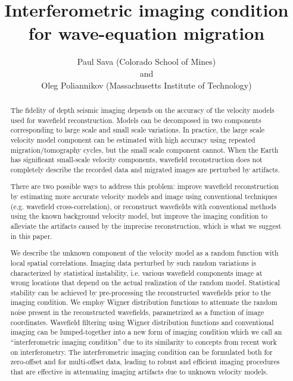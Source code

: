 


\title{Interferometric imaging condition for wave-equation migration}
\author{
Paul Sava (Colorado School of Mines) 
\\ and \\
Oleg Poliannikov (Massachusetts Institute of Technology)
}

\maketitle

\begin{abstract}
The fidelity of depth seismic imaging depends on the accuracy of the
velocity models used for wavefield reconstruction. Models can be
decomposed in two components corresponding to large scale and small
scale variations. In practice, the large scale velocity model
component can be estimated with high accuracy using repeated
migration/tomography cycles, but the small scale component
cannot. When the Earth has significant small-scale velocity
components, wavefield reconstruction does not completely describe the
recorded data and migrated images are perturbed by artifacts.

There are two possible ways to address this problem: improve wavefield
reconstruction by estimating more accurate velocity models and image
using conventional techniques (e.g. wavefield cross-correlation), or
reconstruct wavefields with conventional methods using the known
background velocity model, but improve the imaging condition to
alleviate the artifacts caused by the imprecise reconstruction, which
is what we suggest in this paper.

We describe the unknown component of the velocity model as a random
function with local spatial correlations. Imaging data perturbed by
such random variations is characterized by statistical instability,
i.e. various wavefield components image at wrong locations that depend
on the actual realization of the random model. Statistical stability
can be achieved by pre-processing the reconstructed wavefields prior
to the imaging condition. We employ Wigner distribution functions to
attenuate the random noise present in the reconstructed wavefields,
parametrized as a function of image coordinates. Wavefield filtering
using Wigner distribution functions and conventional imaging can be
lumped-together into a new form of imaging condition which we call an
``interferometric imaging condition'' due to its similarity to
concepts from recent work on interferometry. The interferometric
imaging condition can be formulated both for zero-offset and for
multi-offset data, leading to robust and efficient imaging procedures
that are effective in attenuating imaging artifacts due to unknown
velocity models.
\end{abstract}

